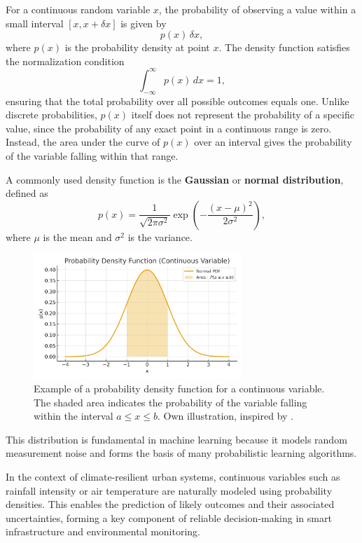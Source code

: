 \documentclass[12pt]{article}
\begin{document}
For a continuous random variable \( x \), the probability of observing a value within a small interval \([x, x + \delta x]\) is given by
\[
p(x) \, \delta x,
\]
where \( p(x) \) is the probability density at point \( x \). 
The density function satisfies the normalization condition
\[
\int_{-\infty}^{\infty} p(x) \, dx = 1,
\]
ensuring that the total probability over all possible outcomes equals one. 
Unlike discrete probabilities, \( p(x) \) itself does not represent the probability of a specific value, since the probability of any exact point in a continuous range is zero. 
Instead, the area under the curve of \( p(x) \) over an interval gives the probability of the variable falling within that range.

A commonly used density function is the \textbf{Gaussian} or \textbf{normal distribution}, defined as
\[
p(x) = \frac{1}{\sqrt{2\pi\sigma^2}} \exp{\left(-\frac{(x - \mu)^2}{2\sigma^2}\right)},
\]
where \( \mu \) is the mean and \( \sigma^2 \) is the variance. 

\begin{figure}[h!]
    \centering
    \includegraphics[width=0.7\textwidth]{images/pdf_continuous_density.png}
    \caption{Example of a probability density function for a continuous variable. 
    The shaded area indicates the probability of the variable falling within the interval \(a \le x \le b\).
    Own illustration, inspired by \cite{bishop2006pattern}.}
    \label{fig:pdf_example}
\end{figure}


This distribution is fundamental in machine learning because it models random measurement noise and forms the basis of many probabilistic learning algorithms.

In the context of climate-resilient urban systems, continuous variables such as rainfall intensity or air temperature are naturally modeled using probability densities. 
This enables the prediction of likely outcomes and their associated uncertainties, forming a key component of reliable decision-making in smart infrastructure and environmental monitoring.
\end{document}

